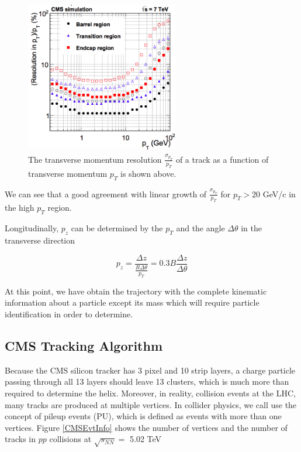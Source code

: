 \begin{figure}[hbtp]
\begin{center}
\includegraphics[width=0.60\textwidth]{Figures/Chapter4/CMSpTReso.png}
\caption{The transverse momentum resolution $\frac{\sigma_{p_T}}{p_T}$ of a track as a function of transverse momentum $p_T$ is shown above.}
\label{CMSpTReso}
\end{center}
\end{figure} 

We can see that a good agreement with linear growth of $\frac{\sigma_{p_T}}{p_T}$ for $p_T > 20$ GeV/c in the high $p_T$ region.

Longitudinally, $p_z$ can be determined by the $p_T$ and the angle $\Delta \theta$ in the transverse direction 

\begin{equation}
p_z = \frac{\Delta z}{\frac{R\Delta \theta}{p_T}} = 0.3B \frac{\Delta z}{\Delta \theta}
\end{equation}

At this point, we have obtain the trajectory with the complete kinematic information about a particle except its mass which will require particle identification in order to determine.

\subsection{CMS Tracking Algorithm}


Because the CMS silicon tracker has 3 pixel and 10 strip layers, a charge particle passing through all 13 layers should leave 13 clusters, which is much more than required to determine the helix. Moreover, in reality, collision events at the LHC, many tracks are produced at multiple vertices. In collider physics, we call use the concept of pileup events (PU), which is defined as events with more than one vertices. Figure \ref{CMSEvtInfo} shows the number of vertices and the number of tracks in $pp$ collisions at $\sqrt{s_{NN}} = $ 5.02 TeV

